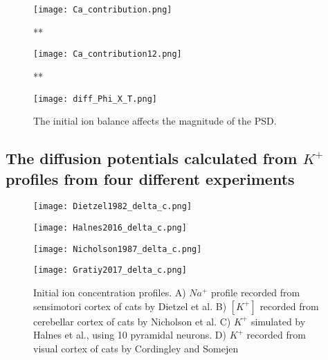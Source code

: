 \documentclass{article}
\begin{document}
\begin{figure}
  \texttt{[image: Ca\_contribution.png]}
  \caption{ **
}
  \label{fig:Ca_contribution}
\end{figure}

\begin{figure}
  \texttt{[image: Ca\_contribution12.png]}
  \caption{ **
}
  \label{fig:Ca_contribution12}
\end{figure}

\begin{figure}
  \texttt{[image: diff\_Phi\_X\_T.png]}
  \caption{The initial ion balance affects the magnitude of the PSD.}
  \label{fig:diff_Phi_X_T}
\end{figure}
 



\subsection{The diffusion potentials calculated from $K^+$ profiles from four different experiments}\label{diffusion potentials}

\begin{figure}[!tbp]
  \centering
  \begin{minipage}[b]{0.45\textwidth}
    \texttt{[image: Dietzel1982\_delta\_c.png]}
  \end{minipage}
  \hfill
  \begin{minipage}[b]{0.45\textwidth}
    \texttt{[image: Halnes2016\_delta\_c.png]}
  \end{minipage}
    \begin{minipage}[b]{0.45\textwidth}
    \texttt{[image: Nicholson1987\_delta\_c.png]}
  \end{minipage}
  \hfill
  \begin{minipage}[b]{0.45\textwidth}
    \texttt{[image: Gratiy2017\_delta\_c.png]}
  \end{minipage}
  \caption{Initial ion concentration profiles. A) $Na^+$ profile recorded from sensimotori cortex of cats by Dietzel et al. B) $[K^+]$  recorded from cerebellar cortex of cats by Nicholson et al. C)  $K^+$ simulated by Halnes et al., using 10 pyramidal neurons. D) $K^+$ recorded from visual cortex of cats by Cordingley and Somejen }
  \label{fig:initial concentrations}
\end{figure} 
\end{document}
